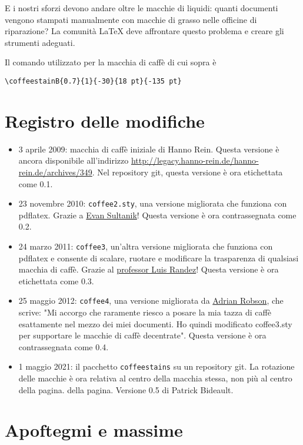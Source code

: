 \documentclass[a4paper, 11pt, BCOR = 0 pt, oneside]{scrartcl}
\begin{document}
E i nostri sforzi devono andare oltre le macchie di liquidi: quanti documenti
vengono stampati manualmente con macchie di grasso nelle officine di
riparazione? La comunità \LaTeX{} deve affrontare questo problema e creare gli
strumenti adeguati.

\vfill{}

\begin{tcolorbox}
Il comando utilizzato per la macchia di caffè di cui sopra è

  \verb|\coffeestainB{0.7}{1}{-30}{18 pt}{-135 pt}|
\end{tcolorbox}
\newpage{}
\section{Registro delle modifiche}
\begin{itemize}
\item 3 aprile 2009: macchia di caffè iniziale di Hanno Rein. Questa versione
  è ancora disponibile all'indirizzo
  \url{http://legacy.hanno-rein.de/hanno-rein.de/archives/349}. Nel repository
  git, questa versione è ora etichettata come 0.1.
\item 23 novembre 2010: \texttt{coffee2.sty}, una versione migliorata che
  funziona con pdflatex.  Grazie a \href{http://www.sultanik.com/}{Evan
    Sultanik}! Questa versione è ora contrassegnata come 0.2.
\item 24 marzo 2011: \texttt{coffee3}, un'altra versione migliorata che funziona con pdflatex
e consente di scalare, ruotare e modificare la trasparenza di qualsiasi macchia di caffè.
Grazie al \href{http://pcmap.unizar.es/~pilar/}{professor Luis
    Randez}! Questa versione è ora etichettata come 0.3.
\item 25 maggio 2012: \texttt{coffee4}, una versione migliorata da
  \href{http://nepsweb.co.uk/homeapr/}{Adrian Robson}, che scrive: "Mi accorgo
  che raramente riesco a posare la mia tazza di caffè esattamente nel mezzo dei
  miei documenti. Ho quindi modificato coffee3.sty per supportare le macchie di
  caffè decentrate". Questa versione è ora contrassegnata come 0.4.
\item 1 maggio 2021: il pacchetto \texttt{coffeestains} su un repository git. La
  rotazione delle macchie è ora relativa al centro della macchia stessa, non più
  al centro della pagina.  della pagina. Versione 0.5 di Patrick Bideault.
\end{itemize}
\label{stainC}

\section{Apoftegmi e massime}
\end{document}
